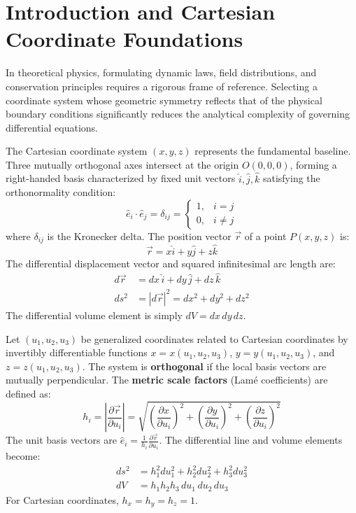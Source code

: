 \section{Introduction and Cartesian Coordinate Foundations}
In theoretical physics, formulating dynamic laws, field distributions, and conservation principles requires a rigorous frame of reference. Selecting a coordinate system whose geometric symmetry reflects that of the physical boundary conditions significantly reduces the analytical complexity of governing differential equations.

The Cartesian coordinate system $(x, y, z)$ represents the fundamental baseline. Three mutually orthogonal axes intersect at the origin $O(0,0,0)$, forming a right-handed basis characterized by fixed unit vectors $\hat{i}, \hat{j}, \hat{k}$ satisfying the orthonormality condition:
\begin{equation}
\hat{e}_i \cdot \hat{e}_j = \delta_{ij} = \begin{cases} 1, & i = j \\ 0, & i \neq j \end{cases}
\end{equation}
where $\delta_{ij}$ is the Kronecker delta. The position vector $\vec{r}$ of a point $P(x, y, z)$ is:
\begin{equation}
\vec{r} = x\hat{i} + y\hat{j} + z\hat{k}
\end{equation}
The differential displacement vector and squared infinitesimal arc length are:
\begin{align}
d\vec{r} &= dx\,\hat{i} + dy\,\hat{j} + dz\,\hat{k} \\
ds^2 &= |d\vec{r}|^2 = dx^2 + dy^2 + dz^2
\end{align}
The differential volume element is simply $dV = dx\,dy\,dz$.

\begin{mathdefinition}
Let $(u_1, u_2, u_3)$ be generalized coordinates related to Cartesian coordinates by invertibly differentiable functions $x = x(u_1, u_2, u_3)$, $y = y(u_1, u_2, u_3)$, and $z = z(u_1, u_2, u_3)$. The system is \textbf{orthogonal} if the local basis vectors are mutually perpendicular. The \textbf{metric scale factors} (Lamé coefficients) are defined as:
\begin{equation}
h_i = \left|\frac{\partial \vec{r}}{\partial u_i}\right| = \sqrt{\left(\frac{\partial x}{\partial u_i}\right)^2 + \left(\frac{\partial y}{\partial u_i}\right)^2 + \left(\frac{\partial z}{\partial u_i}\right)^2}
\end{equation}
The unit basis vectors are $\hat{e}_i = \frac{1}{h_i}\frac{\partial \vec{r}}{\partial u_i}$. The differential line and volume elements become:
\begin{align}
ds^2 &= h_1^2 du_1^2 + h_2^2 du_2^2 + h_3^2 du_3^2 \\
dV &= h_1 h_2 h_3\,du_1\,du_2\,du_3
\end{align}
For Cartesian coordinates, $h_x = h_y = h_z = 1$.
\end{mathdefinition}

